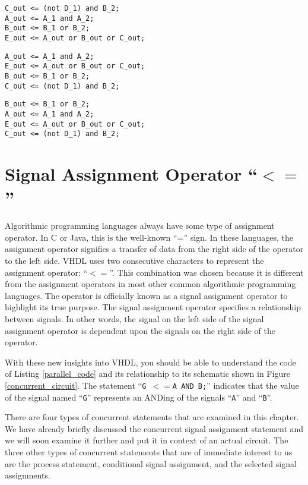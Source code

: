 \begin{lstlisting}[label=parallel_code_2, caption=Equivalent VHDL code for the circuit of Figure 4.1. ]
C_out <= (not D_1) and B_2; 
A_out <= A_1 and A_2;   
B_out <= B_1 or B_2; 
E_out <= A_out or B_out or C_out;
\end{lstlisting}
\begin{lstlisting}[label=parallel_code_3, caption=Equivalent VHDL code for the circuit of Figure 4.1.]
A_out <= A_1 and A_2;   
E_out <= A_out or B_out or C_out;
B_out <= B_1 or B_2; 
C_out <= (not D_1) and B_2; 
\end{lstlisting}
\begin{lstlisting}[label=parallel_code_4, caption=Equivalent VHDL code for the circuit of Figure 4.1.]
B_out <= B_1 or B_2; 
A_out <= A_1 and A_2;   
E_out <= A_out or B_out or C_out;
C_out <= (not D_1) and B_2; 
\end{lstlisting}

\section{Signal Assignment Operator ``$<=$''}
Algorithmic programming languages always have some type of assignment operator. In C or Java, this is the well-known ``='' sign. In these languages, the assignment operator signifies a transfer of data from the right side of the operator to the left side. VHDL uses two consecutive characters to represent the assignment operator: ``$<=$''. This combination was chosen because it is different from the assignment operators in most other common algorithmic programming languages. The operator is officially known as a signal assignment operator to highlight its true purpose. The signal assignment operator specifies a relationship between signals. In other words, the signal on the left side of the signal assignment operator is dependent upon the signals on the right side of the operator.

With these new insights into VHDL, you should be able to understand the code of Listing \ref{parallel_code} and its relationship to its schematic shown in Figure \ref{concurrent_circuit}. The statement ``\texttt{\footnotesize G~$<=$A~AND~B;}'' indicates that the value of the signal named ``\texttt{\footnotesize G}'' represents an ANDing of the signals ``\texttt{\footnotesize A}'' and ``\texttt{\footnotesize B}''.

There are four types of concurrent statements that are examined in this chapter. We have already briefly discussed the concurrent signal assignment statement and we will soon examine it further and put it in context of an actual circuit. The three other types of concurrent statements that are of immediate interest to us are the process statement, conditional signal assignment, and the selected signal assignments.

